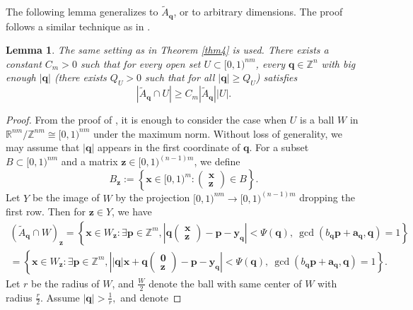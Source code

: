 \documentclass[reqno]{amsart}
\newtheorem{lemma}{Lemma}
\theoremstyle{definition}
\theoremstyle{remark}
\begin{document}
The following lemma generalizes \cite[Lemma 7]{AR22} to $\tilde{A}_\mathbf{q}$, or \cite[Proposition 1]{BHV24} to arbitrary dimensions. The proof follows a similar technique as in \cite{AR23}.
\begin{lemma}
    The same setting as in Theorem \ref{thm4} is used. There exists a constant $C_m>0$ such that for every open set $U \subset [0,1)^{nm}$, every $\mathbf{q} \in \mathbb{Z}^n$ with big enough $|\mathbf q|$ (there exists $Q_U >0 $ such that for all $|\mathbf{q}| \geq Q_U$) satisfies
    $$|\tilde A_\mathbf q \cap U| \geq C_m |\tilde A_\mathbf{q}| |U|.$$
\end{lemma}
\begin{proof}
    From the proof of \cite[Lemma 7]{AR22}, it is enough to consider the case when $U$ is a ball $W$ in $\mathbb R^{nm} /\mathbb Z^{nm} \cong [0,1)^{nm}$ under the maximum norm. Without loss of generality, we may assume that $|\mathbf q|$ appears in the first coordinate of $\mathbf q$. For a subset $B \subset [0,1)^{nm}$ and a matrix $\mathbf{z} \in [0,1)^{(n-1)m}$, we define
    $$B_\mathbf{z} := \left\{ \mathbf x \in [0,1)^m : \begin{pmatrix} \mathbf x \\ \mathbf z \end{pmatrix} \in B\right\}.$$
    Let $Y$ be the image of $W$ by the projection $[0,1)^{nm} \to [0,1)^{(n-1)m}$ dropping the first row. Then for $\mathbf z \in Y$, we have
    \begin{align*}
        (\tilde A_\mathbf q \cap W)_\mathbf z = \left\{ \mathbf x \in W_\mathbf z : \exists \mathbf{p} \in \mathbb{Z}^m, \left| \mathbf q \begin{pmatrix} \mathbf{x} \\ \mathbf{z} \end{pmatrix} - \mathbf p - \mathbf y_\mathbf q \right| < \Psi(\mathbf q) , \ \gcd(b_\mathbf q \mathbf p +\mathbf a_\mathbf q, \mathbf q) = 1 \right\} \\
        = \left\{ \mathbf x \in W_\mathbf z : \exists \mathbf{p} \in \mathbb{Z}^m, \left| |\mathbf q| \mathbf x + \mathbf q \begin{pmatrix} \mathbf{0} \\ \mathbf{z} \end{pmatrix} - \mathbf p - \mathbf y_\mathbf q \right| < \Psi(\mathbf q) , \ \gcd(b_\mathbf q \mathbf p +\mathbf a_\mathbf q, \mathbf q) = 1 \right\}.
    \end{align*}
    Let $r$ be the radius of $W$, and $\frac{W}{2}$ denote the ball with same center of $W$ with radius $\frac{r}{2}$. Assume $|\mathbf{q}| > \frac{1}{r},$ and denote

\end{proof}
\end{document}
